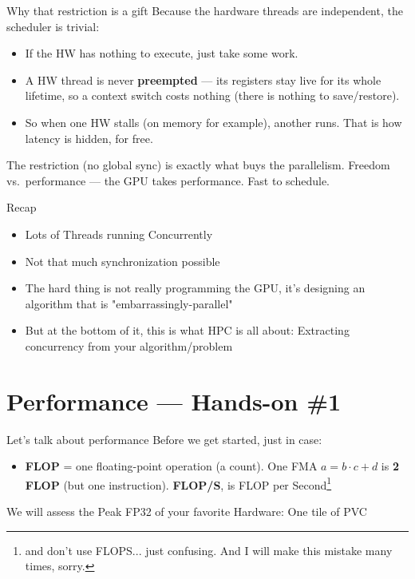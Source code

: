 \begin{frame}{Why that restriction is a gift}
Because the hardware threads are independent, the scheduler is trivial:
\begin{itemize}
    \item If the HW has nothing to execute, just take some work.
    \item A HW thread is never \textbf{preempted} --- its registers stay live for
          its whole lifetime, so a context switch costs nothing (there is nothing
          to save/restore).
    \item So  when one HW stalls (on memory for example), another runs. That is
          how \alert{latency is hidden}, for free.
\end{itemize}
\alert{The restriction (no global sync) is exactly what buys the parallelism.}
Freedom vs.\ performance --- the GPU takes performance. Fast to schedule.
\end{frame}

\begin{frame}{Recap}
    \begin{itemize}
        \item Lots of Threads running Concurrently
        \item Not that much synchronization possible
        \item The hard thing is not really programming the GPU, it's designing an algorithm that is "embarrassingly-parallel"
        \item But at the bottom of it, this is what HPC is all about: Extracting concurrency from your algorithm/problem
    \end{itemize}
\end{frame}

\section{Performance --- Hands-on \#1}

\begin{frame}{Let's talk about performance}
Before we get started, just in case:
\begin{itemize}
    \item \textbf{FLOP} = one floating-point operation (a count). One FMA
          $a{=}b{\cdot}c{+}d$ is \textbf{2 FLOP} (but one instruction). \textbf{FLOP/S}, is FLOP per Second\footnote{and don't use FLOPS... just confusing. And I will make this mistake many times, sorry.}
\end{itemize}

We will assess the Peak FP32 of your favorite Hardware: One tile of PVC
\end{frame}

